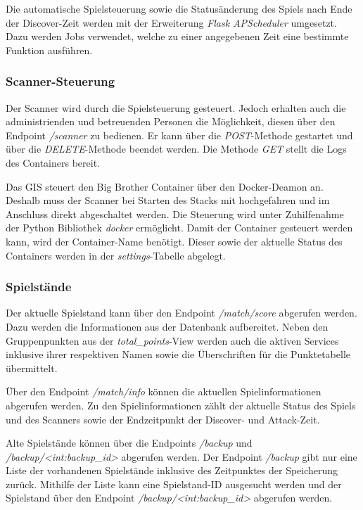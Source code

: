 Die automatische Spielsteuerung sowie die Statusänderung des Spiels nach Ende der Discover-Zeit werden mit der Erweiterung \textit{Flask APScheduler} umgesetzt. Dazu werden Jobs verwendet, welche zu einer angegebenen Zeit eine bestimmte Funktion ausführen.

\subsubsection{Scanner-Steuerung}
Der Scanner wird durch die Spielsteuerung gesteuert. Jedoch erhalten auch die administrienden und betreuenden Personen die Möglichkeit, diesen über den Endpoint \textit{/scanner} zu bedienen.
Er kann über die \textit{POST}-Methode gestartet und über die \textit{DELETE}-Methode beendet werden. Die Methode \textit{GET} stellt die Logs des Containers bereit.

Das GIS steuert den Big Brother Container über den Docker-Deamon an. Deshalb muss der Scanner bei Starten des Stacks mit hochgefahren und im Anschluss direkt abgeschaltet werden. Die Steuerung wird unter Zuhilfenahme der Python Bibliothek \textit{docker} ermöglicht. Damit der Container gesteuert werden kann, wird der Container-Name benötigt. Dieser sowie der aktuelle Status des Containers werden in der \textit{settings}-Tabelle abgelegt.

\subsubsection{Spielstände}
Der aktuelle Spielstand kann über den Endpoint \textit{/match/score} abgerufen werden. Dazu werden die Informationen aus der Datenbank aufbereitet. Neben den Gruppenpunkten aus der \textit{total\_points}-View werden auch die aktiven Services inklusive ihrer respektiven Namen sowie die Überschriften für die Punktetabelle übermittelt.

Über den Endpoint \textit{/match/info} können die aktuellen Spielinformationen abgerufen werden. Zu den Spielinformationen zählt der aktuelle Status des Spiels und des Scanners sowie der Endzeitpunkt der Discover- und Attack-Zeit.

Alte Spielstände können über die Endpoints \textit{/backup} und \textit{/backup/<int:backup\_id>} abgerufen werden.
Der Endpoint \textit{/backup} gibt nur eine Liste der vorhandenen Spielstände inklusive des Zeitpunktes der Speicherung zurück. Mithilfe der Liste kann eine Spielstand-ID ausgesucht werden und der Spielstand über den Endpoint \textit{/backup/<int:backup\_id>} abgerufen werden.

